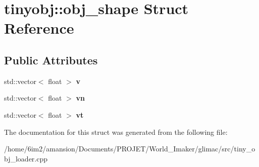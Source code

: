 \hypertarget{structtinyobj_1_1obj__shape}{}\section{tinyobj\+:\+:obj\+\_\+shape Struct Reference}
\label{structtinyobj_1_1obj__shape}
\subsection*{Public Attributes}
\begin{DoxyCompactItemize}
\item 
\mbox{\label{structtinyobj_1_1obj__shape_ad088c2525809a91953fca51798f64b89}} 
std\+::vector$<$ float $>$ {\bfseries v}
\item 
\mbox{\label{structtinyobj_1_1obj__shape_ac87ced8cdff16da62a202bd390e77a8e}} 
std\+::vector$<$ float $>$ {\bfseries vn}
\item 
\mbox{\label{structtinyobj_1_1obj__shape_a2d6dcc97e66ca2596dd50236c899b456}} 
std\+::vector$<$ float $>$ {\bfseries vt}
\end{DoxyCompactItemize}


The documentation for this struct was generated from the following file\+:\begin{DoxyCompactItemize}
\item 
/home/6im2/amansion/\+Documents/\+P\+R\+O\+J\+E\+T/\+World\+\_\+\+Imaker/glimac/src/tiny\+\_\+obj\+\_\+loader.\+cpp\end{DoxyCompactItemize}
